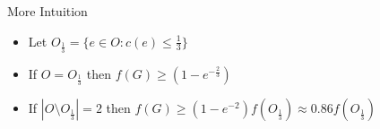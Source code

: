 \begin{frame}{More Intuition}
    \begin{itemize}[<+(1)>]
        \item Let $O_{\frac{1}{3}} = \{e \in O : c(e) \leq \frac{1}{3}\}$    
        \item If $O = O_{\frac{1}{3}}$ then $f(G) \geq (1 - e^{-\frac{2}{3}})$
        \item If $|O \setminus O_{\frac{1}{3}}| = 2$ then $f(G) \geq (1 - e^{-2})f(O_{\frac{1}{3}}) \approx 0.86f(O_{\frac{1}{3}})$
    \end{itemize}
\end{frame}